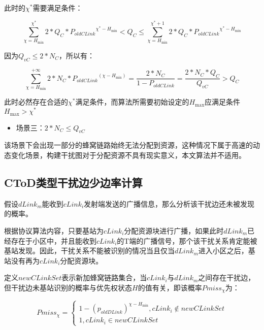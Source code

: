 \documentclass[figurelist,tablelist,algorithmlist,nomlist,masters]{seuthesix}
\begin{document}
	此时的$\chi ^*$需要满足条件：

	\begin{equation}\label{eq3.1}
	\sum\limits_{\chi = H_{\min }}^{\chi ^*} {2*Q_C*{P_{oldCLink}}^{\chi ^* - H_{\min }}} < Q_C \le \sum\limits_{\chi = H_{\min }}^{\chi ^* + 1} {2*Q_C*{P_{oldCLink}}^{\chi ^* - H_{\min }}} 
	\end{equation}

	因为$Q_{vC} \le 2*N_C$，所以有：

	\begin{equation}\label{eq3.1}
	\sum\limits_{\chi = H_{\min }}^{ + \infty } {2*N_C*{P_{oldCLink}}^(\chi - H_{\min })}  = \frac{{2*N_C}}{{1 - {P_{oldCLink}}}} = \frac{{2*N_C*Q_C}}{{Q_{vC}}} > Q_C
	\end{equation}

	此时必然存在合适的$\chi ^*$满足条件，而算法所需要初始设定的$H_{\max }$应满足条件$H_{\max } > \chi ^*$
	
	\begin{itemize}
		\item 场景三：$2*N_C \le Q_{vC}$
	\end{itemize}

	该场景下会出现一部分的蜂窝链路始终无法分配到资源，这种情况下属于高速的动态变化场景，构建干扰图对于分配资源不具有现实意义，本文算法并不适用。
	
	
	\subsection{CToD类型干扰边少边率计算}
	假设$dLink_m$能收到$cLink_i$发射端发送的广播信息，那么分析该干扰边还未被发现的概率。
	
	根据协议算法内容，只要基站为$cLink_i$分配资源块进行广播，如果此时$dLink_m$已经存在于小区中，并且能收到$cLink_i$的T端的广播信号，那个该干扰关系肯定能被基站发现。因此，干扰关系不能被识别的情况当且仅当$dLink_m$进入小区之后，基站没有再为$cLink_i$分配资源块。
	
	定义$newCLinkSet$表示新加蜂窝链路集合，当$cLink_i$与$dLink_m$之间存在干扰边，但干扰边未基站识别的概率与优先权状态$H$的值有关，即该概率$Pmiss_{\chi }$为：
	
	\begin{equation}\label{eq3.1}
	Pmiss_{\chi } = \left\{ \begin{array}{l}
	1 - {({p_{oldDLink}})^{\chi - H_{\min }}},cLink_i \notin newCLinkSet \\
	1,cLink_i \in newCLinkSet 
	\end{array} \right.
	\end{equation}
	
\end{document}
